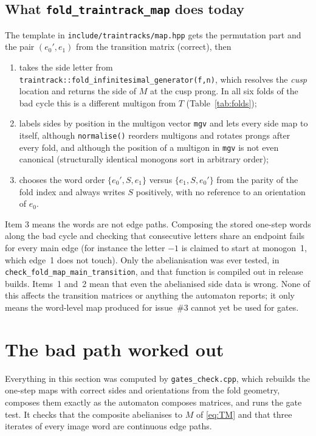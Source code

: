 \documentclass[12pt]{amsart}
\newcommand{\code}[1]{\texttt{#1}}
\theoremstyle{plain}
\theoremstyle{definition}
\begin{document}
\subsection*{What \code{fold\_traintrack\_map} does today}
The template in \code{include/traintracks/map.hpp} gets the permutation
part and the pair $(e_0',e_1)$ from the transition matrix (correct), then
\begin{enumerate}
  \item takes the side letter from
    \code{traintrack::fold\_infinitesimal\_generator(f,n)}, which resolves
    the \emph{cusp} location and returns the side of $M$ at the cusp prong.
    In all six folds of the bad cycle this is a different multigon from
    $T$ (Table~\ref{tab:folds});
  \item labels sides by position in the multigon vector \code{mgv} and lets
    every side map to itself, although \code{normalise()} reorders
    multigons and rotates prongs after every fold, and although the
    position of a multigon in \code{mgv} is not even canonical
    (structurally identical monogons sort in arbitrary order);
  \item chooses the word order $\{e_0',S,e_1\}$ versus $\{e_1,S,e_0'\}$
    from the parity of the fold index and always writes $S$ positively,
    with no reference to an orientation of $e_0$.
\end{enumerate}
Item 3 means the words are not edge paths.  Composing the stored one-step
words along the bad cycle and checking that consecutive letters share an
endpoint fails for every main edge (for instance the letter $-1$ is claimed
to start at monogon~1, which edge~1 does not touch).  Only the
abelianisation was ever tested, in \code{check\_fold\_map\_main\_transition},
and that function is compiled out in release builds.  Items~1 and~2 mean
that even the abelianised side data is wrong.  None of this affects the
transition matrices or anything the automaton reports; it only means the
word-level map produced for issue~\#3 cannot yet be used for gates.

\section{The bad path worked out}
\label{sec:example}

Everything in this section was computed by \code{gates\_check.cpp}, which
rebuilds the one-step maps with correct sides and orientations from the
fold geometry, composes them exactly as the automaton composes matrices,
and runs the gate test.  It checks that the composite abelianises to $M$ of
\eqref{eq:TM} and that three iterates of every image word are continuous
edge paths.
\end{document}
